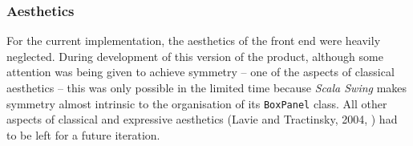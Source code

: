 \subsubsection{Aesthetics}
For the current implementation, the aesthetics of the front end were heavily
neglected. During development of this version of the product, although some
attention was being given to achieve symmetry -- one of the aspects of
classical aesthetics  -- this was only possible in the
limited time because \emph{Scala Swing} makes symmetry almost intrinsic to
the organisation of its \texttt{BoxPanel} class. All other aspects of classical
and expressive aesthetics (Lavie and Tractinsky, 2004,
\cite[cited][p.~102]{benyon2005designing}) had to be left for a future
iteration.
